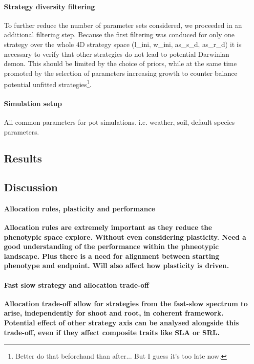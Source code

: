\paragraph{Strategy diversity filtering}
To further reduce the number of parameter sets considered, we proceeded in an additional filtering step. Because the first filtering was conduced for only one strategy over the whole 4D strategy space (l\_ini,  w\_ini, as\_s\_d, as\_r\_d) it is necessary to verify that other strategies do not lead to potential Darwinian demon. This should be limited by the choice of priors, while at the same time promoted by the selection of parameters increasing growth to counter balance potential unfitted strategies\footnote{Better do that beforehand than after... But I guess it's too late now.}.

\paragraph{Simulation setup}
All common parameters for pot simulations. i.e. weather, soil, default species parameters.


\subsection{Results}


\subsection{Discussion}
\paragraph{Allocation rules, plasticity and performance}

\textbf{Allocation rules are extremely important as they reduce the phenotypic space explore. Without even considering plasticity. Need a good understanding of the performance within the phneotypic landscape. Plus there is a need for alignment between starting phenotype and endpoint. Will also affect how plasticity is driven.}

\paragraph{Fast slow strategy and allocation trade-off}

\textbf{Allocation trade-off allow for strategies from the fast-slow spectrum to arise, independently for shoot and root, in coherent framework. Potential effect of other strategy axis can be analysed alongside this trade-off, even if they affect composite traits like SLA or SRL.}

